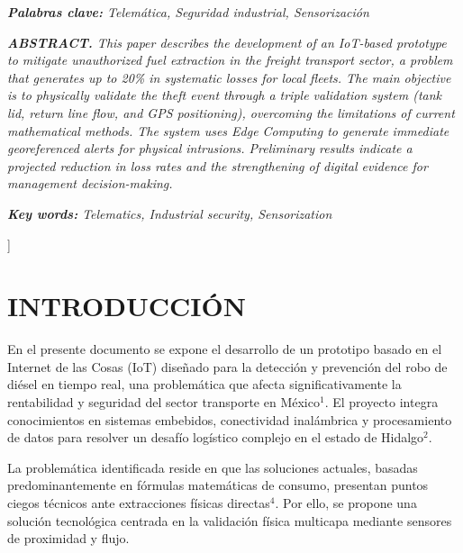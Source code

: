 \documentclass[twocolumn, 10pt]{article}
\begin{document}
  \vspace{0.2cm}
  \begin{center}
    {\fontsize{8}{10}\selectfont \textit{\textbf{Palabras clave:} Telemática, Seguridad industrial, Sensorización}}
  \end{center}

  \vspace{0.4cm}

  {\fontsize{8}{10}\selectfont
    \textit{\textbf{ABSTRACT.} This paper describes the development of an IoT-based prototype to mitigate unauthorized fuel extraction in the freight transport sector, a problem that generates up to 20\% in systematic losses for local fleets. The main objective is to physically validate the theft event through a triple validation system (tank lid, return line flow, and GPS positioning), overcoming the limitations of current mathematical methods. The system uses Edge Computing to generate immediate georeferenced alerts for physical intrusions. Preliminary results indicate a projected reduction in loss rates and the strengthening of digital evidence for management decision-making.}
  }

  \vspace{0.2cm}
  \begin{center}
    {\fontsize{8}{10}\selectfont \textit{\textbf{Key words:} Telematics, Industrial security, Sensorization}}
  \end{center}

  \vspace{0.8cm}
]

\section*{INTRODUCCIÓN}

En el presente documento se expone el desarrollo de un prototipo basado en el Internet de las Cosas (IoT) diseñado para la detección y prevención del robo de diésel en tiempo real, una problemática que afecta significativamente la rentabilidad y seguridad del sector transporte en México$^{1}$. El proyecto integra conocimientos en sistemas embebidos, conectividad inalámbrica y procesamiento de datos para resolver un desafío logístico complejo en el estado de Hidalgo$^{2}$.

La problemática identificada reside en que las soluciones actuales, basadas predominantemente en fórmulas matemáticas de consumo, presentan puntos ciegos técnicos ante extracciones físicas directas$^{4}$. Por ello, se propone una solución tecnológica centrada en la validación física multicapa mediante sensores de proximidad y flujo.
\end{document}
